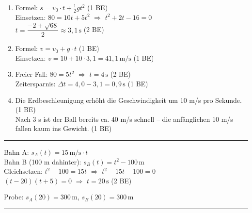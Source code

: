 \documentclass[11pt,a4paper]{article}
\newcounter{aufgabe}
\newcommand{\lsg}[1]{\textcolor{correct}{#1}}
\newcommand{\be}[1]{\hfill\textcolor{correct}{\small(#1 BE)}}
\begin{document}
\begin{enumerate}
\item[a)] \lsg{Formel: $s = v_0 \cdot t + \frac{1}{2}gt^2$} \be{1}\\
\lsg{Einsetzen: $80 = 10t + 5t^2$ $\Rightarrow$ $t^2 + 2t - 16 = 0$}\\
\lsg{$t = \dfrac{-2 + \sqrt{68}}{2} \approx 3{,}1\,\mathrm{s}$} \be{2}

\item[b)] \lsg{Formel: $v = v_0 + g \cdot t$} \be{1}\\
\lsg{Einsetzen: $v = 10 + 10 \cdot 3{,}1 = 41{,}1\,\mathrm{m/s}$} \be{1}

\item[c)] \lsg{Freier Fall: $80 = 5t^2$ $\Rightarrow$ $t = 4\,\mathrm{s}$} \be{2}\\
\lsg{Zeitersparnis: $\Delta t = 4{,}0 - 3{,}1 = 0{,}9\,\mathrm{s}$} \be{1}

\item[d)] \lsg{Die Erdbeschleunigung erhöht die Geschwindigkeit um 10 m/s pro Sekunde.} \be{1}\\
\lsg{Nach 3 s ist der Ball bereits ca. 40 m/s schnell -- die anfänglichen 10 m/s fallen kaum ins Gewicht.} \be{1}
\end{enumerate}

\vspace{0.3cm}
\hrule
\vspace{0.3cm}

\noindent{}

\vspace{0.3cm}

\lsg{Bahn A: $s_A(t) = 15\,\mathrm{m/s} \cdot t$}\\
\lsg{Bahn B (100 m dahinter): $s_B(t) = t^2 - 100\,\mathrm{m}$}\\[0.2cm]
\lsg{Gleichsetzen: $t^2 - 100 = 15t$ $\Rightarrow$ $t^2 - 15t - 100 = 0$}\\
\lsg{$(t - 20)(t + 5) = 0$ $\Rightarrow$ $t = 20\,\mathrm{s}$} \be{2}

{\small\color{correct} Probe: $s_A(20) = 300\,\mathrm{m}$, $s_B(20) = 300\,\mathrm{m}$ \checkmark}

\vspace{0.3cm}
\hrule
\vspace{0.3cm}

\begin{center}
\end{center}
\end{document}
